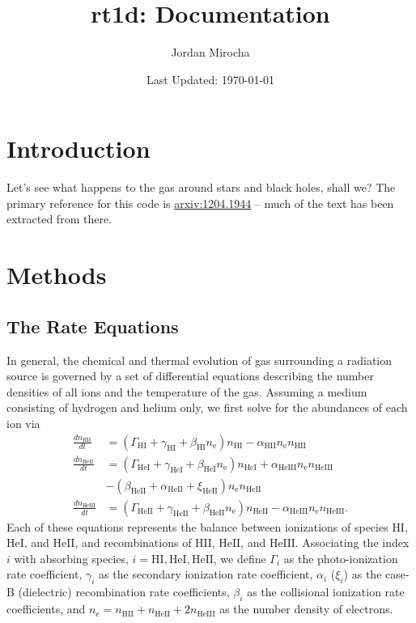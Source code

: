 \documentclass[letterpaper,titlepage,12pt]{article}
\numberwithin{equation}{section}
\newcommand{\HI}{\text{HI}}
\newcommand{\HII}{\text{HII}}
\newcommand{\HeI}{\text{HeI}}
\newcommand{\HeII}{\text{HeII}}
\newcommand{\HeIII}{\text{HeIII}}
\newcommand{\nHI}{n_{\text{HI}}}
\newcommand{\nHII}{n_{\text{HII}}}
\newcommand{\nHeI}{n_{\text{HeI}}}
\newcommand{\nHeII}{n_{\text{HeII}}}
\newcommand{\nHeIII}{n_{\text{HeIII}}}
\newcommand{\nel}{n_{\text{e}}}
\newcommand{\gHI}{\Gamma_{\text{HI}}}
\newcommand{\gHeI}{\Gamma_{\text{HeI}}}
\newcommand{\gHeII}{\Gamma_{\text{HeII}}}
\newcommand{\aHII}{\alpha_{\text{HII}}}
\newcommand{\aHeII}{\alpha_{\text{HeII}}}
\newcommand{\aHeIII}{\alpha_{\text{HeIII}}}
\newcommand{\bHI}{\beta_{\text{HI}}}
\newcommand{\bHeI}{\beta_{\text{HeI}}}
\newcommand{\bHeII}{\beta_{\text{HeII}}}
\newcommand{\xiHeII}{\xi_{\text{HeII}}}
\begin{document}
\author{Jordan Mirocha}	
\title{\Large {\bf rt1d: Documentation}}
\date{Last Updated: \today}
\maketitle

\setcounter{tocdepth}{2}
\tableofcontents
\newpage

\section{Introduction}
Let's see what happens to the gas around stars and black holes, shall we? The
primary reference for this code is
\href{http://arxiv.org/abs/1204.1944}{arxiv:1204.1944} -- much of the text has
been extracted from there.

\section{Methods}

\subsection{The Rate Equations}
In general, the chemical and thermal evolution of gas surrounding a radiation
source is governed by a set of differential equations describing the number
densities of all ions and the temperature of the gas. Assuming a medium
consisting of hydrogen and helium only, we first solve for the abundances of
each ion via
\begin{align}
    \frac{d \nHII}{dt} & = (\gHI + \gamma_{\HI} + \bHI \nel) \nHI - \aHII \nel \nHII   \label{eq:HIIRateEquation} \\ 
    \frac{d \nHeII}{dt} & = (\gHeI + \gamma_{\HeI} + \bHeI \nel) \nHeI \nonumber + \aHeIII \nel \nHeIII \\  & - (\bHeII + \aHeII + \xiHeII) \nel \nHeII \label{eq:HeIIRateEquation} \\ 
    \frac{d \nHeIII}{dt} & = (\gHeII + \gamma_{\HeII} + \bHeII \nel) \nHeII  - \aHeIII \nel \nHeIII . \label{eq:HeIIIRateEquation}
\end{align}
Each of these equations represents the balance between ionizations of species
$\HI$, $\HeI$, and $\HeII$, and recombinations of $\HII$, $\HeII$, and
$\HeIII$. Associating the index $i$ with absorbing species, $i = \HI, \HeI,
\HeII$, we define $\Gamma_i$ as the photo-ionization rate coefficient,
$\gamma_i$ as the secondary ionization rate coefficient, $\alpha_i$ ($\xi_i$)
as the case-B (dielectric) recombination rate coefficients, $\beta_i$ as the
collisional ionization rate coefficients, and $\nel = \nHII + \nHeII +
2\nHeIII$ as the number density of electrons.
\end{document}
